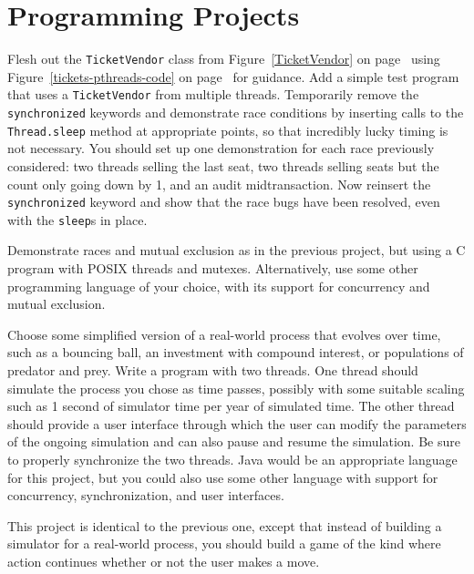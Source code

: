 \section*{Programming Projects}
\begin{chapterEnumerate}
\item\label{blocking-TicketVendor-project}
Flesh out the \verb|TicketVendor| class from Figure~\ref{TicketVendor} on
page~\pageref{TicketVendor}
using Figure~\ref{tickets-pthreads-code} on page~\pageref{tickets-pthreads-code} for guidance.
Add a simple test program that uses a
\verb|TicketVendor| from multiple threads.  Temporarily remove the
\verb|synchronized| keywords and demonstrate race conditions by
inserting calls to the \verb|Thread.sleep| method at appropriate
points, so that incredibly lucky timing is not necessary.  You should
set up one demonstration for each race previously considered: two threads
selling the last seat, two threads selling seats but the count only
going down by 1, and an audit midtransaction.  Now reinsert the
\verb|synchronized| keyword and show that the race bugs have been
resolved, even with the \verb|sleep|s in place.
\item
Demonstrate races and mutual exclusion as in the previous project,
but using a C program with POSIX threads and mutexes.  Alternatively, use some
other programming language of your choice, with its support for
concurrency and mutual exclusion.
\item\label{simulator-synchronization-project}
Choose some simplified version of a real-world process that evolves
over time, such as a bouncing ball, an investment with compound
interest, or populations of predator and prey.  Write a program with
two threads.  One thread should simulate the process you chose as time
passes, possibly with some suitable scaling such as 1 second of
simulator time per year of simulated time.  The other thread should
provide a user interface through which the user can modify the
parameters of the ongoing simulation and can also pause and resume the
simulation.  Be sure to properly synchronize the two threads.  Java
would be an appropriate language for this project, but you could also
use some other language with support for concurrency, synchronization,
and user interfaces.
\item
This project is identical to the previous one, except that instead of
building a simulator for a real-world process, you should build a game
of the kind where action continues whether or not the user makes a
move.
\item\label{bounded-buffer-test-project}

\end{chapterEnumerate}
